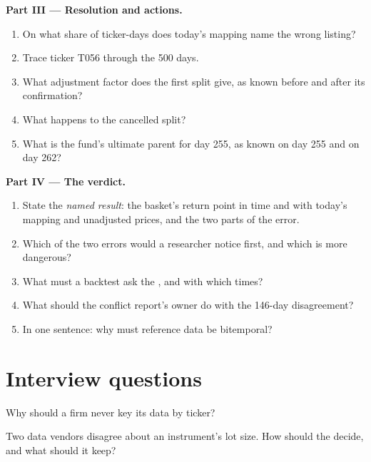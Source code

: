 \begin{problem}
\medskip\noindent\textbf{Part III --- Resolution and actions.}
\begin{enumerate}[resume]
\item On what share of ticker-days does today's mapping name the wrong listing?
\item Trace ticker T056 through the 500 days.
\item What adjustment factor does the first split give, as known before and after its confirmation?
\item What happens to the cancelled split?
\item What is the fund's ultimate parent for day 255, as known on day 255 and on day 262?
\end{enumerate}

\medskip\noindent\textbf{Part IV --- The verdict.}
\begin{enumerate}[resume]
\item State the \emph{named result}: the basket's return point in time and with today's mapping and unadjusted prices, and the
two parts of the error.
\item Which of the two errors would a researcher notice first, and which is more dangerous?
\item What must a backtest ask the , and with which times?
\item What should the conflict report's owner do with the 146-day disagreement?
\item In one sentence: why must reference data be bitemporal?
\end{enumerate}
\end{problem}

\section{Interview questions}

\begin{interviewq}\label{iq:pl:reference-data-and-symbology-services:1}
Why should a firm never key its data by ticker?
\end{interviewq}

\begin{interviewq}\label{iq:pl:reference-data-and-symbology-services:2}
Two data vendors disagree about an instrument's lot size. How should the  decide, and what should it keep?
\end{interviewq}

